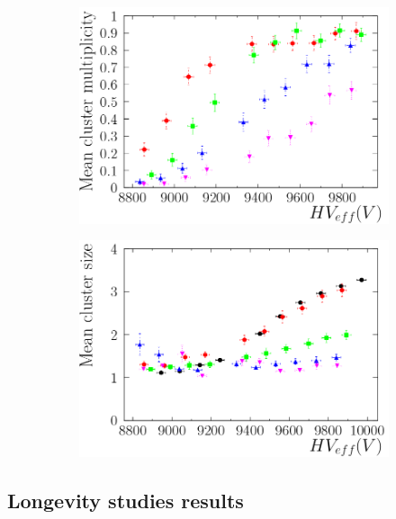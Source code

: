 \begin{figure}[!h]
\begin{subfigure}{0.5\linewidth}
				\begin{center}
					\includegraphics[width = 0.6\plotwidth]{fig/Clustermultiplicities.pdf}
					\caption{\label{fig:GIFResults:CM}}
				\end{center}
			\end{subfigure}
			\begin{subfigure}{0.5\linewidth}
				\begin{center}
					\includegraphics[width = 0.6\plotwidth]{fig/Clustersizes.pdf}\\
					\caption{\label{fig:GIFResults:CS}}
				\end{center}
			\end{subfigure}
			\caption{\label{fig:GIFResults} }
		\end{figure}
	
	\subsection{Longevity studies results}
	\label{ssec:GIF++Results}


\clearpage{\pagestyle{empty}\cleardoublepage}
